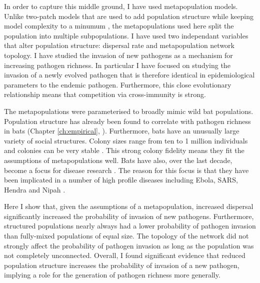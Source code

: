 
In order to capture this middle ground, I have used metapopulation models. 
Unlike two-patch models that are used to add population structure while keeping model complexity to a minumum \cite{qiu2013vector, allen2004sis, garmer2016multistrain}, the metapopulations used here split the population into multiple subpopulations.
I have used two independant variables that alter population structure: dispersal rate and metapopulation network topology.
I have studied the invasion of new pathogens as a mechanism for increasing pathogen richness.
In particular I have focused on studying the invasion of a newly evolved pathogen that is therefore identical in epidemiological parameters to the endemic pathogen.
Furthermore, this close evolutionary relationship means that competition via cross-immunity is strong.

The metapopulations were parameterised to broadly mimic wild bat populations.
Population structure has already been found to correlate with pathogen richness in bats (Chapter \ref{ch:empirical}, \cites{gay2014parasite, maganga2014bat, turmelle2009correlates}).
Furthermore, bats have an unusually large variety of social structures.
Colony sizes range from ten to 1 million individuals \cite{jones2009pantheria} and colonies can be very stable \cite{kerth2011bats, mccracken1981social}.
This strong colony fidelity means they fit the assumptions of metapopulations well.
Bats have also, over the last decade, become a focus for disease research \cite{calisher2006bats, hughes2007emerging}.
The reason for this focus is that they have been implicated in a number of high profile diseases including Ebola, SARS, Hendra and Nipah \cite{calisher2006bats, li2005bats}.



Here I show that, given the assumptions of a metapopulation, increased dispersal significantly increased the probability of invasion of new pathogens.
Furthermore, structured populations nearly always had a lower probability of pathogen invasion than fully-mixed populations of equal size.
The topology of the network did not strongly affect the probability of pathogen invasion as long as the population was not completely unconnected.
Overall, I found significant evidence that reduced population structure increases the probability of invasion of a new pathogen, implying a role for the generation of pathogen richness more generally.


